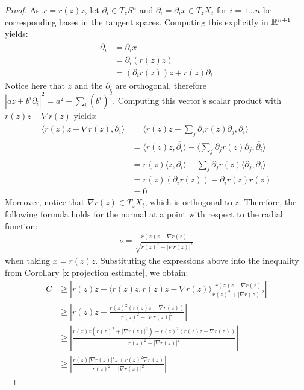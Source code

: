 \begin{proof}
	As $ x = r(z) z $, let $\partial_i\in T_zS^n$ and $\overline{\partial_i}=\partial_i x \in T_zX_t$ for $i=1 \dots n$ be corresponding bases in the tangent spaces. Computing this explicitly in $\mathbb{R}^{n+1}$ yields:
	\begin{align*}
		\overline{\partial_i} &= \partial_i x\\
		&=\partial_i (r(z) z)\\ 
		&= (\partial_i r(z))z + r(z)\partial_i 
	\end{align*}
	Notice here that $z$ and the $\partial_i$ are orthogonal, therefore $|az+b^i\partial_i|^2 = a^2+\sum_i (b^i)^2$. 
	Computing this vector's scalar product with $r(z) z - \nabla r(z)$ yields: 
	\begin{align*}
		\langle  r(z) z - \nabla r(z), \overline{\partial_i} \rangle&= 
		\langle  r(z) z - \sum_j\partial_j r(z) \partial_j, \overline{\partial_i} \rangle\\&= 
		\langle  r(z) z, \overline{\partial_i} \rangle -
		\langle  \sum_j\partial_j r(z) \partial_j, \overline{\partial_i} \rangle\\
		 &=  r(z) \langle z , \overline{\partial_i} \rangle - \sum_j \partial_j r(z) \langle  \partial_j, \overline{\partial_i} \rangle\\
		&=   r(z)(\partial_i r(z)) - \partial_i r(z)r(z) 
		\\&= 0
	\end{align*}
	Moreover, notice that $\nabla r(z)\in T_zX_t$, which is orthogonal to $z$. 
	Therefore, the following formula holds for the normal at a point with respect to the radial function: 
	\begin{align*}
		\nu = \frac{ r(z) z - \nabla r(z) }{\sqrt{r(z)^2  + |\nabla r(z)|^2}}
	\end{align*}
	when taking $ x = r(z) z $. Substituting the expressions above into the inequality from Corollary \ref{x projection estimate}, we obtain:
	\begin{align*}
		C&\geq\left\vert r(z) z - \langle r(z) z ,  r(z) z - \nabla r(z) \rangle \frac{ r(z) z - \nabla r(z) }{r(z)^2  + |\nabla r(z)|^2} \right\vert \\
		&\geq\left\vert r(z) z -  \frac{ r(z)^2(r(z) z - \nabla r(z)) }{r(z)^2  + |\nabla r(z)|^2} \right\vert \\
		&\geq\left\vert\frac{ r(z) z (r(z)^2  + |\nabla r(z)|^2)  -r(z)^2(r(z) z - \nabla r(z)) }{r(z)^2  + |\nabla r(z)|^2} \right\vert \\
		&\geq\left\vert\frac{ r(z)|\nabla r(z)|^2z    + r(z)^2 \nabla r(z) }{r(z)^2  + |\nabla r(z)|^2} \right\vert

\end{align*}
\end{proof}
